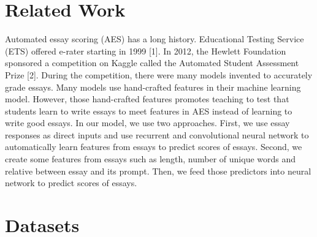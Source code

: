 \documentclass[11pt,conference]{IEEEtran}
\begin{document}
\section{Related Work}

Automated essay scoring (AES) has a long history. Educational Testing Service (ETS) offered e-rater starting in 1999 [1]. In 2012, the Hewlett Foundation sponsored a competition on Kaggle called the Automated Student Assessment Prize [2]. During the competition, there were many models invented to accurately grade essays. Many models use hand-crafted features in their machine learning model. However, those hand-crafted features promotes teaching to test that students learn to write essays to meet features in AES instead of learning to write good essays. In our model, we use two approaches. First, we use essay responses as direct inputs and use recurrent and convolutional neural network to automatically learn features from essays to predict scores of essays. Second, we create some features from essays such as length, number of unique words and relative between essay and its prompt. Then, we feed those predictors into neural network to predict scores of essays.

\section{Datasets}
\end{document}
